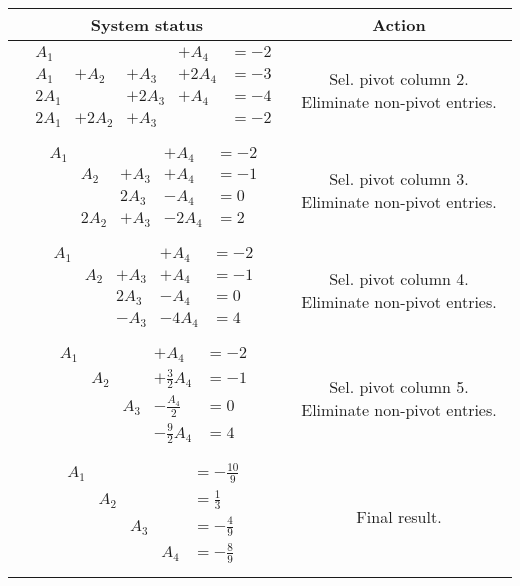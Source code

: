 {\begin{longtable}{cc} System status & Action \\\hline $\begin{array}{llllll} & A_{1} & & & +A_{4} & =-2\\ & A_{1} & +A_{2} & +A_{3} & +2A_{4} & =-3\\ & 2A_{1} & & +2A_{3} & +A_{4} & =-4\\ & 2A_{1} & +2A_{2} & +A_{3} & & =-2\\\end{array}$& Sel. pivot column 2. Eliminate non-pivot entries. \\\hline $\begin{array}{llllll} & A_{1} & & & +A_{4} & =-2\\ & & A_{2} & +A_{3} & +A_{4} & =-1\\ & & & 2A_{3} & -A_{4} & =0\\ & & 2A_{2} & +A_{3} & -2A_{4} & =2\\\end{array}$& Sel. pivot column 3. Eliminate non-pivot entries. \\\hline $\begin{array}{llllll} & A_{1} & & & +A_{4} & =-2\\ & & A_{2} & +A_{3} & +A_{4} & =-1\\ & & & 2A_{3} & -A_{4} & =0\\ & & & -A_{3} & -4A_{4} & =4\\\end{array}$& Sel. pivot column 4. Eliminate non-pivot entries. \\\hline $\begin{array}{llllll} & A_{1} & & & +A_{4} & =-2\\ & & A_{2} & & +\frac{3}{2}A_{4} & =-1\\ & & & A_{3} & -\frac{A_{4} }{2} & =0\\ & & & & -\frac{9}{2}A_{4} & =4\\\end{array}$& Sel. pivot column 5. Eliminate non-pivot entries. \\\hline $\begin{array}{llllll} & A_{1} & & & & =-\frac{10}{9}\\ & & A_{2} & & & =\frac{1}{3}\\ & & & A_{3} & & =-\frac{4}{9}\\ & & & & A_{4} & =-\frac{8}{9}\\\end{array}$& Final result.\\ \end{longtable}

}
